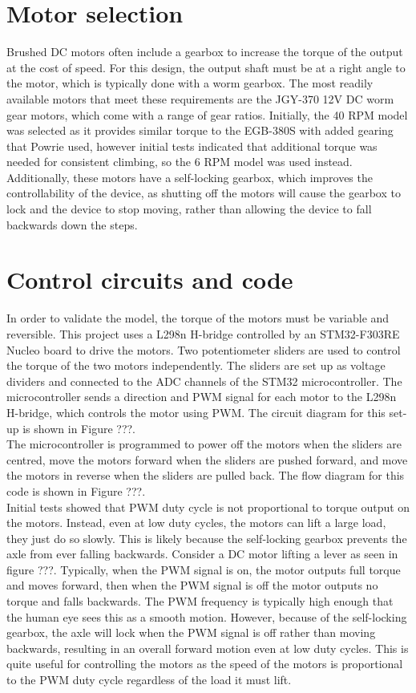\section{Motor selection}
Brushed DC motors often include a gearbox to increase the torque of the output at the cost of speed. For this design, the output shaft must be at a right angle to the motor, which is typically done with a worm gearbox. The most readily available motors that meet these requirements are the JGY-370 12V DC worm gear motors, which come with a range of gear ratios. Initially, the 40 RPM model was selected as it provides similar torque to the EGB-380S with added gearing that Powrie used, however initial tests indicated that additional torque was needed for consistent climbing, so the 6 RPM model was used instead.\\
Additionally, these motors have a self-locking gearbox, which improves the controllability of the device, as shutting off the motors will cause the gearbox to lock and the device to stop moving, rather than allowing the device to fall backwards down the steps.

\section{Control circuits and code}
In order to validate the model, the torque of the motors must be variable and reversible. This project uses a L298n H-bridge controlled by an STM32-F303RE Nucleo board to drive the motors. Two potentiometer sliders are used to control the torque of the two motors independently. The sliders are set up as voltage dividers and connected to the ADC channels of the STM32 microcontroller. The microcontroller sends a direction and PWM signal for each motor to the L298n H-bridge, which controls the motor using PWM. The circuit diagram for this set-up is shown in Figure ???.\\
The microcontroller is programmed to power off the motors when the sliders are centred, move the motors forward when the sliders are pushed forward, and move the motors in reverse when the sliders are pulled back. The flow diagram for this code is shown in Figure ???.\\

Initial tests showed that PWM duty cycle is not proportional to torque output on the motors. Instead, even at low duty cycles, the motors can lift a large load, they just do so slowly. This is likely because the self-locking gearbox prevents the axle from ever falling backwards. Consider a DC motor lifting a lever as seen in figure ???. Typically, when the PWM signal is on, the motor outputs full torque and moves forward, then when the PWM signal is off the motor outputs no torque and falls backwards. The PWM frequency is typically high enough that the human eye sees this as a smooth motion. However, because of the self-locking gearbox, the axle will lock when the PWM signal is off rather than moving backwards, resulting in an overall forward motion even at low duty cycles. This is quite useful for controlling the motors as the speed of the motors is proportional to the PWM duty cycle regardless of the load it must lift.\\

